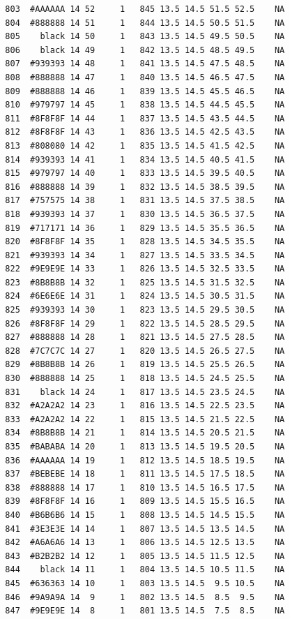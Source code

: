 \documentclass[12pt,twoside]{reedthesis}
\begin{document}
\begin{verbatim}
  803  #AAAAAA 14 52     1   845 13.5 14.5 51.5 52.5    NA
  804  #888888 14 51     1   844 13.5 14.5 50.5 51.5    NA
  805    black 14 50     1   843 13.5 14.5 49.5 50.5    NA
  806    black 14 49     1   842 13.5 14.5 48.5 49.5    NA
  807  #939393 14 48     1   841 13.5 14.5 47.5 48.5    NA
  808  #888888 14 47     1   840 13.5 14.5 46.5 47.5    NA
  809  #888888 14 46     1   839 13.5 14.5 45.5 46.5    NA
  810  #979797 14 45     1   838 13.5 14.5 44.5 45.5    NA
  811  #8F8F8F 14 44     1   837 13.5 14.5 43.5 44.5    NA
  812  #8F8F8F 14 43     1   836 13.5 14.5 42.5 43.5    NA
  813  #808080 14 42     1   835 13.5 14.5 41.5 42.5    NA
  814  #939393 14 41     1   834 13.5 14.5 40.5 41.5    NA
  815  #979797 14 40     1   833 13.5 14.5 39.5 40.5    NA
  816  #888888 14 39     1   832 13.5 14.5 38.5 39.5    NA
  817  #757575 14 38     1   831 13.5 14.5 37.5 38.5    NA
  818  #939393 14 37     1   830 13.5 14.5 36.5 37.5    NA
  819  #717171 14 36     1   829 13.5 14.5 35.5 36.5    NA
  820  #8F8F8F 14 35     1   828 13.5 14.5 34.5 35.5    NA
  821  #939393 14 34     1   827 13.5 14.5 33.5 34.5    NA
  822  #9E9E9E 14 33     1   826 13.5 14.5 32.5 33.5    NA
  823  #8B8B8B 14 32     1   825 13.5 14.5 31.5 32.5    NA
  824  #6E6E6E 14 31     1   824 13.5 14.5 30.5 31.5    NA
  825  #939393 14 30     1   823 13.5 14.5 29.5 30.5    NA
  826  #8F8F8F 14 29     1   822 13.5 14.5 28.5 29.5    NA
  827  #888888 14 28     1   821 13.5 14.5 27.5 28.5    NA
  828  #7C7C7C 14 27     1   820 13.5 14.5 26.5 27.5    NA
  829  #8B8B8B 14 26     1   819 13.5 14.5 25.5 26.5    NA
  830  #888888 14 25     1   818 13.5 14.5 24.5 25.5    NA
  831    black 14 24     1   817 13.5 14.5 23.5 24.5    NA
  832  #A2A2A2 14 23     1   816 13.5 14.5 22.5 23.5    NA
  833  #A2A2A2 14 22     1   815 13.5 14.5 21.5 22.5    NA
  834  #8B8B8B 14 21     1   814 13.5 14.5 20.5 21.5    NA
  835  #BABABA 14 20     1   813 13.5 14.5 19.5 20.5    NA
  836  #AAAAAA 14 19     1   812 13.5 14.5 18.5 19.5    NA
  837  #BEBEBE 14 18     1   811 13.5 14.5 17.5 18.5    NA
  838  #888888 14 17     1   810 13.5 14.5 16.5 17.5    NA
  839  #8F8F8F 14 16     1   809 13.5 14.5 15.5 16.5    NA
  840  #B6B6B6 14 15     1   808 13.5 14.5 14.5 15.5    NA
  841  #3E3E3E 14 14     1   807 13.5 14.5 13.5 14.5    NA
  842  #A6A6A6 14 13     1   806 13.5 14.5 12.5 13.5    NA
  843  #B2B2B2 14 12     1   805 13.5 14.5 11.5 12.5    NA
  844    black 14 11     1   804 13.5 14.5 10.5 11.5    NA
  845  #636363 14 10     1   803 13.5 14.5  9.5 10.5    NA
  846  #9A9A9A 14  9     1   802 13.5 14.5  8.5  9.5    NA
  847  #9E9E9E 14  8     1   801 13.5 14.5  7.5  8.5    NA

\end{verbatim}
\end{document}
